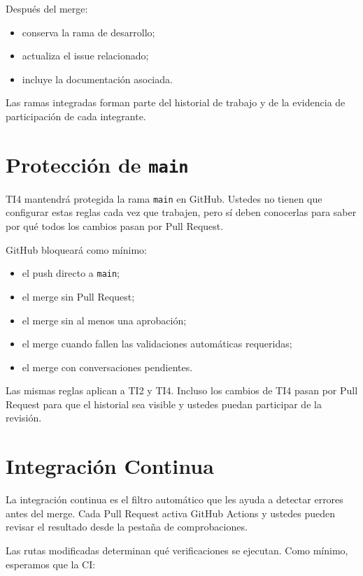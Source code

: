 \documentclass[11pt,a4paper]{article}
\begin{document}
Después del merge:
\begin{itemize}
  \item conserva la rama de desarrollo;
  \item actualiza el issue relacionado;
  \item incluye la documentación asociada.
\end{itemize}

Las ramas integradas forman parte del historial de trabajo y de la evidencia de
participación de cada integrante.

\section{Protección de \texttt{main}}

TI4 mantendrá protegida la rama \texttt{main} en GitHub. Ustedes no tienen que
configurar estas reglas cada vez que trabajen, pero sí deben conocerlas para
saber por qué todos los cambios pasan por Pull Request.

GitHub bloqueará como mínimo:

\begin{itemize}
  \item el push directo a \texttt{main};
  \item el merge sin Pull Request;
  \item el merge sin al menos una aprobación;
  \item el merge cuando fallen las validaciones automáticas requeridas;
  \item el merge con conversaciones pendientes.
\end{itemize}

Las mismas reglas aplican a TI2 y TI4. Incluso los cambios de TI4 pasan por
Pull Request para que el historial sea visible y ustedes puedan participar de
la revisión.


\section{Integración Continua}

La integración continua es el filtro automático que les ayuda a detectar
errores antes del merge. Cada Pull Request activa GitHub Actions y ustedes
pueden revisar el resultado desde la pestaña de comprobaciones.

Las rutas modificadas determinan qué verificaciones se ejecutan. Como mínimo,
esperamos que la CI:
\end{document}
